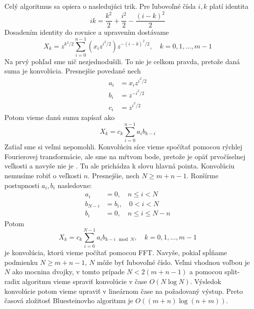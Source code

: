 Celý algoritmus sa opiera o nasledujúci trik. Pre ľubovoľné čísla
$i,k$ platí identita
\begin{equation}
    ik = \frac{k^2}{2} + \frac{i^2}{2} - \frac{(i-k)^2}{2}
\end{equation}
Dosadením identity do rovnice a upravením dostávame
\begin{equation}
    X_k = z^{k^2/2}
        \sum_{i=0}^{n-1} 
            \left(x_i z^{i^2/2} \right)
            z^{-(i-k)^2/2}
        , \quad k = 0,1,\dots,m-1
\end{equation}
Na prvý pohľad sme nič nezjednodušili. To nie je celkom pravda,
pretože daná suma je konvolúcia. Presnejšie povedané nech
\begin{align}
    a_i &= x_i z^{i^2/2} \\
    b_i &= z^{-i^2/2} \\
    c_i &= z^{i^2/2}
\end{align}
Potom vieme danú sumu zapísať ako
\begin{equation}
    X_k = c_k \sum_{i=0}^{n-1} a_i b_{k-i}
\end{equation}
Zaťiaľ sme si veľmi nepomohli. Konvolúciu síce vieme spočítať pomocou
rýchlej Fourierovej transformácie, ale sme na mŕtvom bode, pretože
je opäť prvočíselnej veľkosti a navyše nie je . 
Tu ale prichádza k slovu hlavná pointa.
Konvolúciu nemusíme robiť o veľkosti $n$.
Presnejšie, nech $N\ge m+n -1$.
Rozšírme postupnosti $a_i,b_i$ nasledovne:
\begin{align}
    a_i &=0, \quad n\le i<N \\
    b_{N-i} &= b_{i}, \quad 0 < i < N \\
    b_i &= 0, \quad n\le i \le N-n
\end{align}
Potom
\begin{equation}
    X_k = c_k \sum_{i=0}^{N-1} a_i b_{k-i \mod N},
        \quad k = 0,1,\dots,m-1
\end{equation}
je  konvolúcia, ktorú vieme počítať pomocou FFT.
Navyše, pokiaľ spĺňame podmienku $N\ge m+n-1$, $N$ môže byť ľubovoľné
číslo. Veľmi vhodnou voľbou je $N$ ako mocnina dvojky, v tomto prípade
$N < 2(m+n-1)$ a pomocou split-radix algoritmu vieme spraviť
konvolúcie v čase $O(N \log N)$.
Výsledok konvolúcie potom vieme upraviť v lineárnom čase na požadovaný
výstup. Preto časová zložitosť Bluesteinovho algoritmu je
$O( (m+n) \log (n+m))$.


